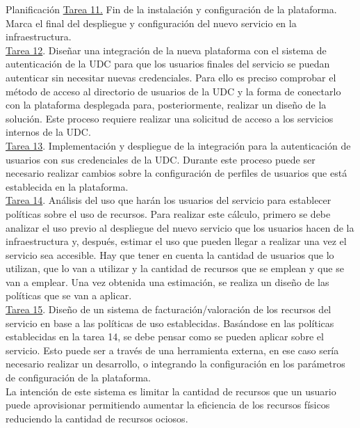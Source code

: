 \begin{chapter}{Planificación}
\underline{Tarea 11.} Fin de la instalación y configuración de la plataforma. Marca el final del despliegue y configuración del nuevo servicio en la infraestructura.\\

\underline{Tarea 12}. Diseñar una integración de la nueva plataforma con el sistema de autenticación de la UDC para que los usuarios finales del servicio se puedan autenticar sin necesitar nuevas credenciales. Para ello es preciso comprobar el método de acceso al directorio de usuarios de la UDC y la forma de conectarlo con la plataforma desplegada para, posteriormente, realizar un diseño de la solución. Este proceso requiere realizar una solicitud de acceso a los servicios internos de la UDC.\\

\underline{Tarea 13}. Implementación y despliegue de la integración para la autenticación de usuarios con sus credenciales de la UDC. Durante este proceso puede ser necesario realizar cambios sobre la configuración de perfiles de usuarios que está establecida en la plataforma.\\

\underline{Tarea 14}. Análisis del uso que harán los usuarios del servicio para establecer políticas sobre el uso de recursos. Para realizar este cálculo, primero se debe analizar el uso previo al despliegue del nuevo servicio que los usuarios hacen de la infraestructura y, después, estimar el uso que pueden llegar a realizar una vez el servicio sea accesible. Hay que tener en cuenta la cantidad de usuarios que lo utilizan, que lo van a utilizar y la cantidad de recursos que se emplean y que se van a emplear. Una vez obtenida una estimación, se realiza un diseño de las políticas que se van a aplicar.\\

\underline{Tarea 15}. Diseño de un sistema de facturación/valoración de los recursos del servicio en base a las políticas de uso establecidas. Basándose en las políticas establecidas en la tarea 14, se debe pensar como se pueden aplicar sobre el servicio. Esto puede ser a través de una herramienta externa, en ese caso sería necesario realizar un desarrollo, o integrando la configuración en los parámetros de configuración de la plataforma.\\
La intención de este sistema es limitar la cantidad de recursos que un usuario puede aprovisionar permitiendo aumentar la eficiencia de los recursos físicos reduciendo la cantidad de recursos ociosos.\\


\end{chapter}
